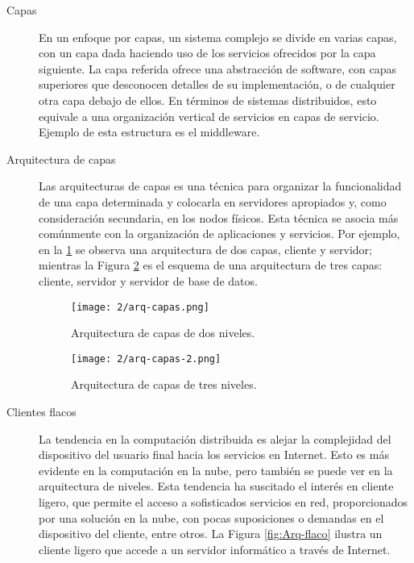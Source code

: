 \begin{description}
	\item[Capas] En un enfoque por capas, un sistema complejo se divide en varias capas, con un capa dada haciendo uso de los servicios ofrecidos por la capa siguiente. La capa referida ofrece una abstracción de software, con capas superiores que desconocen detalles de su implementación, o  de cualquier otra capa debajo de ellos.
	En términos de sistemas distribuidos, esto equivale a una organización vertical de servicios en capas de servicio.  Ejemplo de esta estructura es el \gls{middleware}. 
	
	\item[Arquitectura de capas] Las arquitecturas de capas 
	es una técnica para organizar la funcionalidad de una capa determinada y colocarla en servidores apropiados y, como consideración secundaria, en los nodos físicos. Esta  técnica se asocia más comúnmente con la organización de aplicaciones y servicios. Por ejemplo, en la \ref{fig:Arq-capas} se observa una arquitectura de dos capas, cliente y servidor; mientras la Figura \ref{fig:Arq-capas-3} es el esquema de una arquitectura de tres capas: cliente, servidor y servidor de base de datos.
	
	\begin{figure}  
		\begin{center}%
		\texttt{[image: 2/arq-capas.png]} 
		\caption{Arquitectura de capas de dos niveles.}
		\label{fig:Arq-capas}
	 \end{center} 
 \end{figure} 
	
	\begin{figure}  
		\begin{center}%
 	\texttt{[image: 2/arq-capas-2.png]}
	\caption{Arquitectura de capas de tres niveles.}
	\label{fig:Arq-capas-3}
 \end{center} 
\end{figure} 

	
	\item[Clientes flacos] La tendencia en la computación distribuida es alejar la complejidad del dispositivo del usuario final hacia los servicios en Internet. Esto es más evidente en  la computación en la nube,  pero también se puede ver en la arquitectura de niveles.  Esta tendencia ha suscitado el interés en  \gls{cliente ligero}, que  permite el acceso a sofisticados servicios en red, proporcionados por una solución en la nube, con pocas suposiciones o demandas en el dispositivo del cliente, entre otros.  La Figura \ref{fig:Arq-flaco}  ilustra un cliente ligero que accede a un servidor informático a través de Internet.
	

\end{description}
